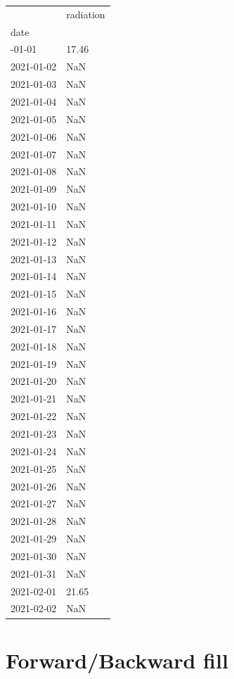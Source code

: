 \documentclass[
  letterpaper,
  DIV=11,
  numbers=noendperiod,
  oneside]{scrreprt}
\begin{document}
\begin{longtable}[]{@{}ll@{}}
\toprule\noalign{}
& radiation \\
date & \\
\midrule\noalign{}
\endhead
\bottomrule\noalign{}
\endlastfoot
2021-01-01 & 17.46 \\
2021-01-02 & NaN \\
2021-01-03 & NaN \\
2021-01-04 & NaN \\
2021-01-05 & NaN \\
2021-01-06 & NaN \\
2021-01-07 & NaN \\
2021-01-08 & NaN \\
2021-01-09 & NaN \\
2021-01-10 & NaN \\
2021-01-11 & NaN \\
2021-01-12 & NaN \\
2021-01-13 & NaN \\
2021-01-14 & NaN \\
2021-01-15 & NaN \\
2021-01-16 & NaN \\
2021-01-17 & NaN \\
2021-01-18 & NaN \\
2021-01-19 & NaN \\
2021-01-20 & NaN \\
2021-01-21 & NaN \\
2021-01-22 & NaN \\
2021-01-23 & NaN \\
2021-01-24 & NaN \\
2021-01-25 & NaN \\
2021-01-26 & NaN \\
2021-01-27 & NaN \\
2021-01-28 & NaN \\
2021-01-29 & NaN \\
2021-01-30 & NaN \\
2021-01-31 & NaN \\
2021-02-01 & 21.65 \\
2021-02-02 & NaN \\
\end{longtable}

\hypertarget{forwardbackward-fill}{%
\section{Forward/Backward fill}\label{forwardbackward-fill}}
\end{document}
